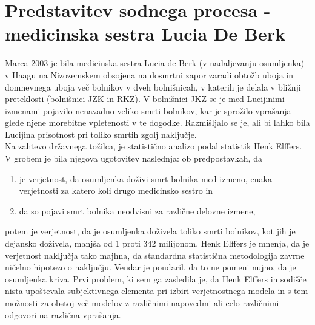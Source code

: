 \documentclass[mat1, tisk]{fmfdelo}
\theoremstyle{definition} %
\theoremstyle{trditev} %
\theoremstyle{izrek}
\begin{document}
\section{Predstavitev sodnega procesa - medicinska sestra Lucia De Berk}
Marca 2003 je bila medicinska sestra Lucia de Berk (v nadaljevanju osumljenka) v Haagu na Nizozemskem obsojena na dosmrtni zapor zaradi obtožb 
uboja in domnevnega uboja več bolnikov v dveh bolnišnicah, v katerih je delala v bližnji preteklosti (bolnišnici JZK in RKZ). V bolnišnici JKZ 
se je med Lucijinimi izmenami pojavilo nenavadno veliko smrti bolnikov, kar je sprožilo vprašanja glede njene morebitne vpletenosti v te dogodke. 
Razmišljalo se je, ali bi lahko bila Lucijina prisotnost pri toliko smrtih zgolj naključje.\\
Na zahtevo državnega tožilca, je statistično analizo podal statistik Henk Elffers. V grobem je bila njegova ugotovitev naslednja: ob predpostavkah, da
\begin{enumerate}
    \item je verjetnost, da osumljenka doživi smrt bolnika med izmeno, enaka verjetnosti za katero koli drugo medicinsko sestro in
    \item da so pojavi smrt bolnika neodvisni za različne delovne izmene,
\end{enumerate}
potem je verjetnost, da je osumljenka doživela toliko smrti bolnikov, kot jih je dejansko doživela, manjša od 1 proti 342 milijonom. Henk Elffers je mnenja, 
da je verjetnost naključja tako majhna, da standardna statistična metodologija zavrne ničelno hipotezo o naključju. Vendar je poudaril, da 
to ne pomeni nujno, da je osumljenka kriva. Prvi problem, ki sem ga zasledila je, da Henk Elffers in sodišče nista upoštevala subjektivnega 
elementa pri izbiri verjetnostnega modela in s tem možnosti za obstoj več modelov z različnimi napovedmi ali celo različnimi odgovori 
na različna vprašanja. 

\end{document}
